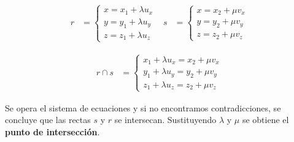 \documentclass{article}
\begin{document}
\begin{align*}
    r & =
    \begin{cases}
       x = x_1 + \lambda u_x\\
       y = y_1 + \lambda u_y\\
       z = z_1 + \lambda u_z 
    \end{cases} &
    s & =
    \begin{cases}
        x = x_2 + \mu v_x\\
        y = y_2 + \mu v_y\\
        z = z_2 + \mu v_z 
     \end{cases}
\end{align*}

\begin{align*}
    r \cap s & =
    \begin{cases}
       x_1 + \lambda u_x = x_2 + \mu v_x\\
       y_1 + \lambda u_y = y_2 + \mu v_y\\
       z_1 + \lambda u_z = z_2 + \mu v_z 
    \end{cases}
\end{align*}

Se opera el sistema de ecuaciones y si no encontramos contradicciones, se 
concluye que las rectas $s$ y $r$ se intersecan. Sustituyendo $\lambda$ y $\mu$
se obtiene el \textbf{punto de intersección}.
\end{document}

